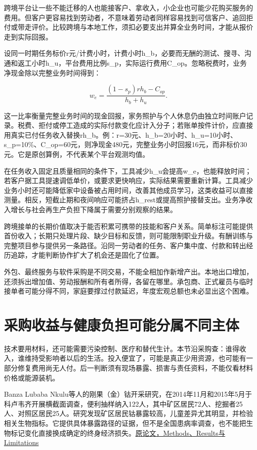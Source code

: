 \documentclass[UTF8,fontset=windows,12pt,a4paper,oneside,openany]{ctexbook}
\begin{document}
跨境平台让一些不能迁移的人也能接客户、拿收入，小企业也可能少花购买服务的费用。但客户更容易找到劳动者，不意味着劳动者同样容易找到可信客户、追回拒付或带走评价。比较跨境与本地工作，须扣必要支出并算全业务时间，才能从报价走到实际回报。

设同一时期任务标价r元/计费小时，计费小时h\_b，必要而无酬的测试、搜寻、沟通和返工小时h\_u，平台费用比例s\_p，实际运行费用C\_op。忽略税费时，业务净现金除以完整业务时间得到：

\[
w_e=\frac{(1-s_p)rh_b-C_{op}}{h_b+h_u}.\tag{13-5}
\]

这一比率衡量完整业务时间的现金回报，家务照护与个人休息仍由独立时间账户记录。税费、拒付或停工造成的实际付款变化应计入分子；若账单按件计价，应直接用真实已付任务收入替换rh\_b。例：r=30元、h\_b=20小时、h\_u=10小时、s\_p=10\%、C\_op=60元，则净现金480元，完整业务小时回报16元，而非标价30元。它是原创算例，不代表某个平台观测均值。

在任务收入固定且质量相同的条件下，工具减少h\_u会提高w\_e，也能释放时间；若客户据工具提速调低单价，或要求更快响应，实际结果需要重新计算。工具减少业务小时还可能降低家中设备被占用时间，改善其他成员学习，这类收益可以直接测量。相反，短截止期和夜间响应可能挤占h\_rest或提高照护接替支出。业务净收入增长与社会再生产负担下降属于需要分别观察的结果。

跨境接单的长期价值取决于能否积累可携带的技能和客户关系。简单标注可能提供首份收入；长期只处理片段、缺少目标和反馈，则可能限制职业升级。有酬训练与完整项目参与提供另一条路径。沿同一劳动者的任务、客户集中度、付款和转出经历追踪，才能判断协作扩大了机会还是固化了位置。

外包、最终服务与软件采购是不同交易，不能全相加作新增产出。本地出口增加，还须拆出增加值、劳动报酬和所有者所得，各留在哪里。承包商、正式雇员与临时接单者可能分得不同，家庭要撑过付款延迟，年度宏观总额也未必显出这个困难。

\section{采购收益与健康负担可能分属不同主体}

技术要用材料，还可能需要污染控制、医疗和替代生计。本节沿采购查：谁得收入，谁维持受影响者以后的生活。投入便宜了，可能是真正少用资源，也可能有一部分修复费用尚无人付。后一判断须有现场暴露、损害与责任资料，不能仅看材料价格或能源装机。

Banza Lubaba Nkulu等人的刚果（金）钴开采研究，在2014年11月和2015年5月于科卢韦齐开展横截面调查，便利抽样纳入122人，其中矿区居民72人、挖掘者25人、对照区居民25人。研究发现矿区居民钴暴露较高，儿童差异尤其明显，并检验相关生物指标。它提供具体暴露路径的证据，但不是全国患病率调查，也不能把生物标记变化直接换成确定的终身经济损失。\href{https://pmc.ncbi.nlm.nih.gov/articles/PMC6166862/}{原论文，Methods、Results与Limitations}
\end{document}
